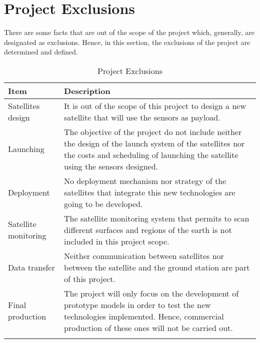 \section{Project Exclusions}

There are some facts that are out of the scope of the project which, generally, are designated as exclusions. Hence, in this section, the exclusions of the project are determined and defined. 

\begin{longtable}[H]{lp{11cm}}
	
	\toprule[2pt]
	
	\textbf{Item} & \textbf{Description} \\
	
	\midrule[1.5pt] 
	\endhead
	
	Satellites design & It is out of the scope of this project to design a new satellite that will use the sensors as payload.\vspace{0.2cm} \\
	
	\midrule
	
	Launching  & The objective of the project do not include neither the design of the launch system of the satellites nor the costs and scheduling of launching the satellite using the sensors designed.\vspace{0.2cm} \\
	
	\midrule
	
	Deployment & No deployment mechanism nor strategy of the satellites that integrate this new technologies are going to be developed.\vspace{0.2cm} \\
	
	\midrule
	
	Satellite monitoring & The satellite monitoring system that permits to scan different surfaces and regions of the earth is not included in this project scope.\vspace{0.2cm} \\
	
	\midrule
	
	Data transfer & Neither communication between satellites nor between the satellite and the ground station are part of this project.\vspace{0.2cm} \\
	
	\midrule
		
	Final production & The project will only focus on the development of prototype models in order to test the new technologies implemented. Hence, commercial production of these ones will not be carried out.\vspace{0.2cm} \\
	
	\bottomrule[2pt]
	
	\caption{Project Exclusions}
\end{longtable}